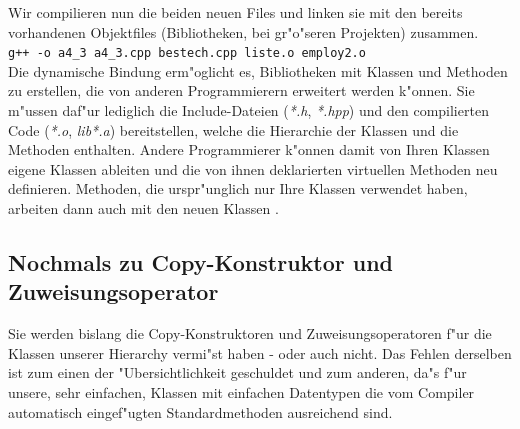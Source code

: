 Wir compilieren nun die beiden neuen Files und linken sie mit
den bereits vorhandenen Objektfiles (Bibliotheken, bei gr"o"seren Projekten)
zusammen.
\\
\verb|g++ -o a4_3 a4_3.cpp bestech.cpp liste.o employ2.o|
\\

Die dynamische Bindung erm"oglicht es, Bibliotheken mit Klassen und Methoden
zu erstellen, die von anderen Programmierern erweitert werden k"onnen.
Sie m"ussen daf"ur lediglich die Include-Dateien (\textit{*.h}, \textit{*.hpp})
und den compilierten Code (\textit{*.o}, \textit{lib*.a}) bereitstellen,
welche die Hierarchie der Klassen und die Methoden enthalten.
Andere Programmierer k"onnen damit von Ihren Klassen eigene Klassen ableiten und
die von ihnen deklarierten virtuellen Methoden neu definieren.
Methoden, die urspr"unglich nur Ihre Klassen verwendet haben, arbeiten dann auch mit
den neuen Klassen \cite[p.164]{Microsoft:1993:REC}.
%
%
\subsection{Nochmals zu Copy-Konstruktor und Zuweisungsoperator}
\label{sec:A2.4}
%
Sie werden bislang die Copy-Konstruktoren und Zuweisungsoperatoren
f"ur die Klassen unserer Hierarchy vermi"st haben - oder auch nicht.
Das Fehlen derselben ist zum einen der "Ubersichtlichkeit geschuldet und
zum anderen, da"s f"ur unsere, sehr einfachen, Klassen mit einfachen Datentypen
die vom Compiler automatisch eingef"ugten Standardmethoden ausreichend sind.

